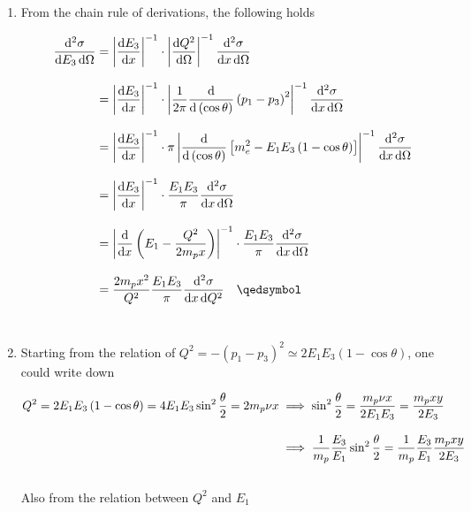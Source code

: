 \begin{solution}
    \begin{enumerate}[label=(\alph*)]
        \item From the chain rule of derivations, the following holds 
        
            \begin{align*}
                \frac{\dif^2 \sigma}{\dif E_3 \dif \Omega} &= \left| \frac{\dif E_3}{ \dif x}\right|^{-1} \cdot \left| \frac{\dif Q^2}{\dif \Omega} \right|^{-1} \frac{\dif^2 \sigma}{\dif x \dif \Omega}  \\[0.12in]
                &= \left| \frac{\dif E_3}{ \dif x}\right|^{-1} \cdot \left| \frac{1}{2\pi}\frac{\dif }{\dif \left( \cos\theta \right)} \left( p_1 - p_3 \right)^2 \right|^{-1} \frac{\dif^2 \sigma}{\dif x \dif \Omega}  \\[0.12in]
                &=  \left| \frac{\dif E_3}{ \dif x}\right|^{-1} \cdot \pi \left|  \frac{\dif }{\dif \left( \cos\theta \right)} \left[ m_e^2 - E_1 E_3 \left( 1-\cos\theta  \right) \right] \right|^{-1} \frac{\dif^2 \sigma}{\dif x \dif \Omega} \\[0.12in]
                &= \left| \frac{\dif E_3}{ \dif x}\right|^{-1} \cdot  \frac{E_1E_3}{\pi} \frac{\dif^2 \sigma}{\dif x \dif \Omega} \\[0.12in]
                &=  \left| \frac{\dif }{ \dif x} \left( E_1 - \frac{Q^2}{2m_p x} \right) \right|^{-1} \cdot  \frac{E_1E_3}{\pi} \frac{\dif^2 \sigma}{\dif x \dif \Omega}  \\[0.12in]
                &= \frac{2m_p x^2}{Q^2} \frac{E_1E_3}{\pi}  \frac{\dif^2 \sigma}{\dif x \dif Q^2} \qed
            \end{align*}\\
        \item  Starting from the relation of $Q^2 = - \left( p_1 - p_3 \right)^2 \simeq 2E_1 E_3 \left( 1-\cos\theta \right) $, one could write down
        
            \begin{align}
                Q^2 = 2E_1 E_3 \left( 1-\cos\theta \right) = 4 E_1 E_3 \sin^2 \frac{\theta}{2} = 2m_p \nu x &\implies \sin^2\frac{\theta}{2} = \frac{ m_p \nu x}{2E_1E_3} = \frac{ m_p  xy}{2 E_3} \nonumber \\[0.12in]
                &\implies \frac{1}{m_p} \frac{E_3}{E_1} \sin^2\frac{\theta}{2} =  \frac{1}{m_p} \frac{E_3}{E_1}\frac{ m_p  xy}{2 E_3} \label{P8.3.b}
            \end{align}\\
        Also from the relation between $Q^2$ and $E_1$


\end{enumerate}
\end{solution}
